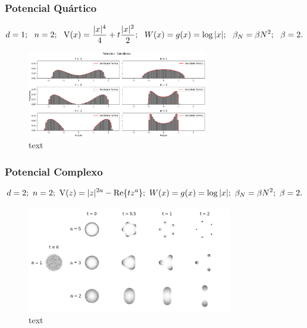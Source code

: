 \begin{frame}
	\frametitle{Potencial Quártico}
	\begin{equation}
	d = 1; \ \  n = 2; \ \ \V(x)=\frac{|x|^4}{4} + t \frac{|x|^2}{2}; \ \ W(x) = g(x) = \log{|x|}; \ \ \beta_N = \beta N^2; \ \ \beta = 2.
\label{Equation: Parametros Quartico}
	\end{equation}
	\begin{figure}
		\centering
		\includegraphics[width=0.7\textwidth]{./media/Results/validationQuarticMonic-alt}	
		\caption{text}
	\end{figure}
\end{frame}
\begin{frame}
	\frametitle{Potencial Complexo}
	\begin{equation}
	d = 2; \  n = 2; \  \V(z)=|z|^{2a} - \Re\{t z^a\};  \ W(x) = g(x) = \log{|x|};  \ \beta_N = \beta N^2;  \ \beta = 2.
	\label{Equation: Complex}
	\end{equation}
	\begin{figure}
		\centering
		\includegraphics[width=0.8\textwidth]{./media/Results/complexPotential}	
		\caption{text}
	\end{figure}
\end{frame}
